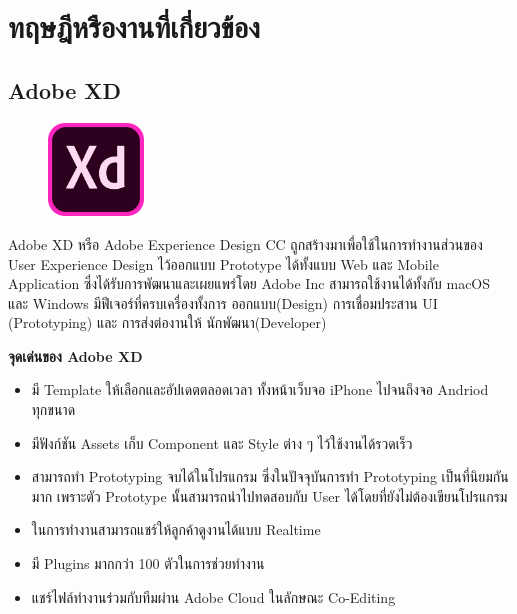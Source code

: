 \chapter{ทฤษฎีหรืองานที่เกี่ยวข้อง}
\label{chapter2}

\section{Adobe XD}
\label{Adobe XD}
\begin{figure}[!thb]
	\captionsetup{justification=centering}
	\centering
	\includegraphics[width=1in]{figures/adobexd.png}
	\label{fig:adobexd}
\end{figure}
Adobe XD หรือ Adobe Experience Design CC ถูกสร้างมาเพื่อใช้ในการทำงานส่วนของ User Experience Design ไว้ออกแบบ Prototype ได้ทั้งแบบ  Web และ Mobile Application ซึ่งได้รับการพัฒนาและเผยแพร่โดย Adobe Inc สามารถใช้งานได้ทั้งกับ macOS และ Windows มีฟีเจอร์ที่ครบเครื่องทั้งการ ออกแบบ(Design) การเชื่อมประสาน UI (Prototyping) และ การส่งต่องานให้ นักพัฒนา(Developer)
\begin{flushleft}
		\textbf{จุดเด่นของ Adobe XD}
\end{flushleft}
\begin{itemize}
    \item มี Template ให้เลือกและอัปเดตตลอดเวลา ทั้งหน้าเว็บจอ iPhone ไปจนถึงจอ Andriod ทุกขนาด
    \item มีฟังก์ชัน Assets เก็บ Component และ Style ต่าง ๆ ไว้ใช้งานได้รวดเร็ว
    \item สามารถทำ Prototyping จบได้ในโปรแกรม ซึ่งในปัจจุบันการทำ Prototyping เป็นที่นิยมกันมาก เพราะตัว Prototype นั้นสามารถนำไปทดสอบกับ User ได้โดยที่ยังไม่ต้องเขียนโปรแกรม
    \item ในการทำงานสามารถแชร์ให้ลูกค้าดูงานได้แบบ Realtime
    \item มี Plugins มากกว่า 100 ตัวในการช่วยทำงาน
    \item แชร์ไฟล์ทำงานร่วมกับทีมผ่าน Adobe Cloud ในลักษณะ Co-Editing
\end{itemize}
\newpage

